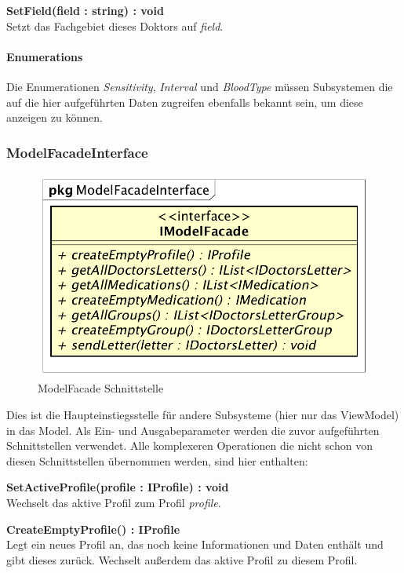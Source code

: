 \documentclass[a4paper]{scrreprt}
\begin{document}
\textbf{SetField(field : string) : void}\\
Setzt das Fachgebiet dieses Doktors auf \textit{field}.

\paragraph{Enumerations}
Die Enumerationen \textit{Sensitivity}, \textit{Interval} und \textit{BloodType} müssen Subsystemen die auf die hier aufgeführten Daten zugreifen ebenfalls bekannt sein, um diese anzeigen zu können.

\subsubsection{ModelFacadeInterface}
\begin{figure}[H]
\centering
\includegraphics[width=0.55\textheight]{graphics/Klassendiagramme/Model/ModelFacadeInterface.png}
\caption{ModelFacade Schnittstelle}
\end{figure}
Dies ist die Haupteinstiegsstelle für andere Subsysteme (hier nur das ViewModel) in das Model. Als Ein- und Ausgabeparameter werden die zuvor aufgeführten Schnittstellen verwendet. Alle komplexeren Operationen die nicht schon von diesen Schnittstellen übernommen werden, sind hier enthalten:


\textbf{SetActiveProfile(profile : IProfile) : void}\\
Wechselt das aktive Profil zum Profil \textit{profile}.

\textbf{CreateEmptyProfile() : IProfile}\\
Legt ein neues Profil an, das noch keine Informationen und Daten enthält und gibt dieses zurück. Wechselt außerdem das aktive Profil zu diesem Profil.
\end{document}
